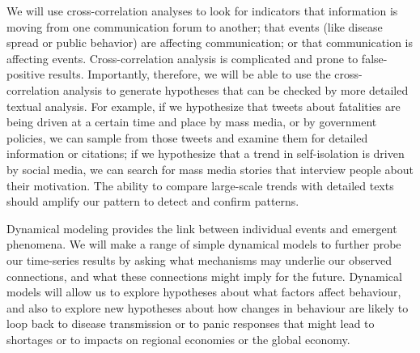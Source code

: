 We will use cross-correlation analyses to look for indicators that information is moving from one communication forum to another; that events (like disease spread or public behavior) are affecting communication; or that communication is affecting events. 
Cross-correlation analysis is complicated and prone to false-positive results. Importantly, therefore, we will be able to use the cross-correlation analysis to generate hypotheses that can be checked by more detailed textual analysis. For example, if we hypothesize that tweets about fatalities are being driven at a certain time and place by mass media, or by government policies, we can sample from those tweets and examine them for detailed information or citations; if we hypothesize that a trend in self-isolation is driven by social media, we can search for mass media stories that interview people about their motivation. The ability to compare large-scale trends with detailed texts should amplify our pattern to detect and confirm patterns.

 Dynamical modeling provides the link between individual events and emergent phenomena. We will make a range of simple dynamical models to further probe our time-series results by asking what mechanisms may underlie our observed connections, and what these connections might imply for the future. Dynamical models will allow us to explore hypotheses about what factors affect behaviour, and also to explore new hypotheses about how changes in behaviour are likely to loop back to disease transmission or to panic responses that might lead to shortages or to impacts on regional economies or the global economy.

